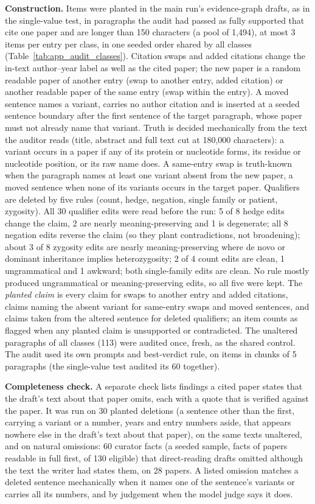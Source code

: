 \documentclass{article} %
\begin{document}
\textbf{Construction.} Items were planted in the main run's evidence-graph drafts, as in the single-value test, in paragraphs the audit had passed as fully supported that cite one paper and are longer than 150 characters (a pool of 1,494), at most 3 items per entry per class, in one seeded order shared by all classes (Table~\ref{tab:app_audit_classes}). Citation swaps and added citations change the in-text author--year label as well as the cited paper; the new paper is a random readable paper of another entry (swap to another entry, added citation) or another readable paper of the same entry (swap within the entry). A moved sentence names a variant, carries no author citation and is inserted at a seeded sentence boundary after the first sentence of the target paragraph, whose paper must not already name that variant. Truth is decided mechanically from the text the auditor reads (title, abstract and full text cut at 180,000 characters): a variant occurs in a paper if any of its protein or nucleotide forms, its residue or nucleotide position, or its raw name does. A same-entry swap is truth-known when the paragraph names at least one variant absent from the new paper, a moved sentence when none of its variants occurs in the target paper. Qualifiers are deleted by five rules (count, hedge, negation, single family or patient, zygosity). All 30 qualifier edits were read before the run: 5 of 8 hedge edits change the claim, 2 are nearly meaning-preserving and 1 is degenerate; all 8 negation edits reverse the claim (so they plant contradictions, not broadening); about 3 of 8 zygosity edits are nearly meaning-preserving where de novo or dominant inheritance implies heterozygosity; 2 of 4 count edits are clean, 1 ungrammatical and 1 awkward; both single-family edits are clean. No rule mostly produced ungrammatical or meaning-preserving edits, so all five were kept. The \emph{planted claim} is every claim for swaps to another entry and added citations, claims naming the absent variant for same-entry swaps and moved sentences, and claims taken from the altered sentence for deleted qualifiers; an item counts as flagged when any planted claim is unsupported or contradicted. The unaltered paragraphs of all classes (113) were audited once, fresh, as the shared control. The audit used its own prompts and best-verdict rule, on items in chunks of 5 paragraphs (the single-value test audited its 60 together).

\textbf{Completeness check.} A separate check lists findings a cited paper states that the draft's text about that paper omits, each with a quote that is verified against the paper. It was run on 30 planted deletions (a sentence other than the first, carrying a variant or a number, years and entry numbers aside, that appears nowhere else in the draft's text about that paper), on the same texts unaltered, and on natural omissions: 60 curator facts (a seeded sample, facts of papers readable in full first, of 130 eligible) that direct-reading drafts omitted although the text the writer had states them, on 28 papers. A listed omission matches a deleted sentence mechanically when it names one of the sentence's variants or carries all its numbers, and by judgement when the model judge says it does.
\end{document}
